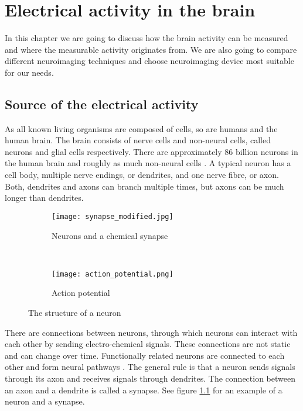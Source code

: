 
\chapter{Electrical activity in the brain}

In this chapter we are going to discuss how the brain activity can be measured and where the measurable activity originates from. We are also going to compare different neuroimaging techniques and choose neuroimaging device most suitable for our needs. 

\section{Source of the electrical activity}
\label{sec:neuron}

As all known living organisms are composed of cells, so are humans and the human brain. The brain consists of nerve cells and non-neural cells, called neurons and glial cells respectively. There are approximately 86 billion neurons in the human brain and roughly as much non-neural cells \cite{neuroncount}. A typical neuron has a cell body, multiple nerve endings, or dendrites, and one nerve fibre, or axon. Both, dendrites and axons can branch multiple times, but axons can be much longer than dendrites. 

\begin{figure}[b!]
	\centering
	\begin{subfigure}{0.48\textwidth}
		\texttt{[image: synapse\_modified.jpg]}
		\caption{Neurons and a chemical synapse \cite[p.~17]{neuronpic}}
		\label{fig:neuron_synapse}
	\end{subfigure}
	~
	\begin{subfigure}{0.48\textwidth}
		\texttt{[image: action\_potential.png]}
		\caption{Action potential \cite{action_potential_pic}}
		\label{fig:action_potential}
	\end{subfigure}
	\caption{The structure of a neuron}
\end{figure}

There are connections between neurons, through which neurons can interact with each other by sending electro-chemical signals. These connections are not static and can change over time. Functionally related neurons are connected to each other and form neural pathways \cite{neuralpathway}. The general rule is that a neuron sends signals through its axon and receives signals through dendrites. The connection between an axon and a dendrite is called a synapse. See figure \ref{fig:neuron_synapse} for an example of a neuron and a synapse.

